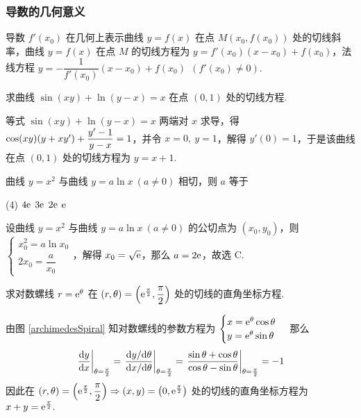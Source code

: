 \subsubsection{导数的几何意义}

导数 $f'(x_0)$ 在几何上表示曲线 $y=f(x)$ 在点 $M(x_0,f(x_0))$ 处的切线斜率，曲线 $y=f(x)$ 在点 $M$ 的切线方程为 $y=f'(x_0)(x-x_0)+f(x_0)$，法线方程 $y=-\dfrac{1}{f'(x_0)}(x-x_0)+f(x_0)~~(f'(x_0)\neq 0).$

\begin{example}[2008 数一]
    求曲线 $\sin(xy)+\ln(y-x)=x$ 在点 $(0,1)$ 处的切线方程.
\end{example}
\begin{solution}
    等式 $\sin(xy)+\ln(y-x)=x$ 两端对 $x$ 求导，得 $\cos(xy)\qty(y+xy')+\dfrac{y'-1}{y-x}=1$，并令 $x=0,~y=1$，解得 $y'(0)=1$，于是该曲线在点 $(0,1)$ 处的切线方程为 $y=x+1.$
\end{solution}

\begin{example}[2010 数二]
    曲线 $y=x^2$ 与曲线 $y=a\ln x~(a\neq 0)$ 相切，则 $a$ 等于
    \begin{tasks}(4)
        \task $4\mathrm{e}$
        \task $3\mathrm{e}$
        \task $2\mathrm{e}$
        \task $\mathrm{e}$
    \end{tasks}
\end{example}
\begin{solution}
    设曲线 $y=x^2$ 与曲线 $y=a\ln x~(a\neq 0)$ 的公切点为 $(x_0,y_0)$，则 $\begin{cases}
            x_0^2=a\ln x_0 \\2x_0=\dfrac{a}{x_0}
        \end{cases}$，解得 $x_0=\sqrt{\mathrm{e}}$，那么 $a=2\mathrm{e}$，故选 C.
\end{solution}

\begin{example}
    求对数螺线 $r=\mathrm{e}^\theta$ 在 $(r,\theta)=\qty(\mathrm{e} ^{\frac{\pi}{2}},\dfrac{\pi}{2})$ 处的切线的直角坐标方程.
\end{example}
\begin{solution}
    由图 \ref{archimedesSpiral} 知对数螺线的参数方程为 $\begin{cases}
        x=\mathrm{e}^\theta\cos\theta\\y=\mathrm{e}^\theta\sin\theta
    \end{cases}$ 那么 
    $$\eval{\dv{y}{x}}_{\theta=\frac{\pi}{2}}=\eval{\dfrac{\dd y/\dd \theta}{\dd x/\dd \theta}}_{\theta=\frac{\pi}{2}}=\eval{\dfrac{\sin\theta+\cos\theta}{\cos\theta-\sin\theta}}_{\theta=\frac{\pi}{2}}=-1$$
    因此在 $(r,\theta)=\qty(\mathrm{e} ^{\frac{\pi}{2}},\dfrac{\pi}{2})\Rightarrow (x,y)=\qty(0,\mathrm{e} ^{\frac{\pi}{2}})$ 处的切线的直角坐标方程为 $x+y=\mathrm{e} ^{\frac{\pi}{2}}.$
\end{solution}

